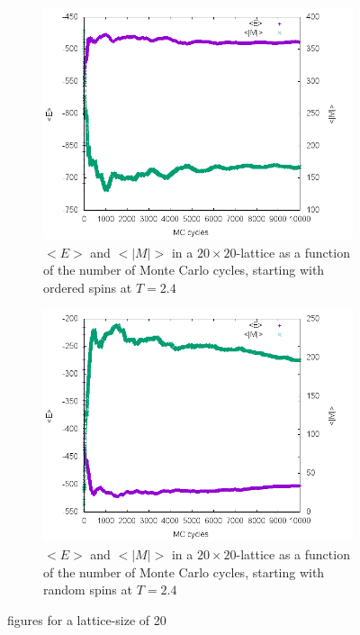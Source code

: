 \documentclass[10pt,a4paper]{article}
\begin{document}
\begin{figure}[h]
\begin{subfigure}{0.45\textwidth}
	\includegraphics[width=\textwidth]{a24o.png}
	\caption{$<E>$ and $<|M|>$ in a $20\times 20$-lattice as a function of the number of Monte Carlo cycles, starting with ordered spins at $T=2.4$\label{c_3}}
\end{subfigure}
\begin{subfigure}{0.45\textwidth}
	\includegraphics[width=\textwidth]{a24r.png}
	\caption{$<E>$ and $<|M|>$ in a $20\times 20$-lattice as a function of the number of Monte Carlo cycles, starting with random spins at $T=2.4$\label{c_4}}
\end{subfigure}
\caption{figures for a lattice-size of 20}
\end{figure}
\end{document}
